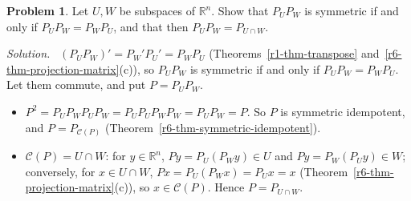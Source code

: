 \documentclass[12pt]{article}
\newcommand{\R}{\mathbb R}
\theoremstyle{definition}
\newtheorem{problem}{Problem}
\newenvironment{solution}{\par\noindent\textit{Solution.}\ }{\par\smallskip}
\begin{document}
\begin{problem}\label{r6-pr-commuting-projections}
Let \(U,W\) be subspaces of \(\R^n\). Show that \(P_UP_W\) is symmetric if and only if \(P_UP_W=P_WP_U\), and that
then \(P_UP_W=P_{U\cap W}\).
\end{problem}
\begin{solution}
\((P_UP_W)'=P_W'P_U'=P_WP_U\) (Theorems~\ref{r1-thm-transpose} and~\ref{r6-thm-projection-matrix}(c)), so
\(P_UP_W\) is symmetric if and only if \(P_UP_W=P_WP_U\). Let them commute, and put \(P=P_UP_W\).
\begin{itemize}
\item \(P^2=P_UP_WP_UP_W=P_UP_UP_WP_W=P_UP_W=P\). So \(P\) is symmetric idempotent, and \(P=P_{\mathcal C(P)}\)
(Theorem~\ref{r6-thm-symmetric-idempotent}).
\item \(\mathcal C(P)=U\cap W\): for \(y\in\R^n\), \(Py=P_U(P_Wy)\in U\) and \(Py=P_W(P_Uy)\in W\); conversely, for
\(x\in U\cap W\), \(Px=P_U(P_Wx)=P_Ux=x\) (Theorem~\ref{r6-thm-projection-matrix}(c)), so \(x\in\mathcal C(P)\). Hence
\(P=P_{U\cap W}\).
\end{itemize}
\end{solution}
\end{document}

